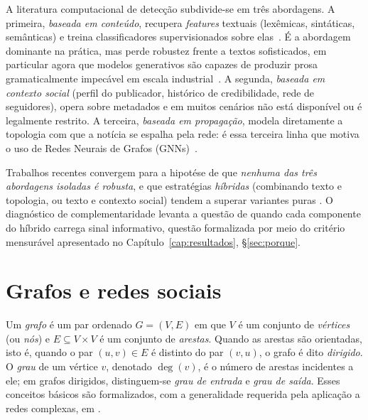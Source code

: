 A literatura computacional de detec\c{c}\~ao subdivide-se em tr\^es
abordagens. A primeira, \emph{baseada em conte\'udo}, recupera
\emph{features} textuais (lex\^emicas, sint\'aticas, sem\^anticas) e
treina classificadores supervisionados sobre elas~\cite{pmc_overviewfakenews,
mdpi_cnn_llm_nlp}. \'E a abordagem dominante na pr\'atica, mas perde
robustez frente a textos sofisticados, em particular agora que modelos
generativos s\~ao capazes de produzir prosa gramaticalmente
impec\'avel em escala industrial~\cite{arxiv_llmfakenews}. A segunda,
\emph{baseada em contexto social} (perfil do publicador, hist\'orico
de credibilidade, rede de seguidores), opera sobre metadados e em
muitos cen\'arios n\~ao est\'a dispon\'ivel ou \'e legalmente
restrito. A terceira, \emph{baseada em propaga\c{c}\~ao}, modela
diretamente a topologia com que a not\'icia se espalha pela rede:
\'e essa terceira linha que motiva o uso de Redes Neurais de Grafos
(GNNs)~\cite{monti2019fakenews, dou2021upfd, pmc_gnnsurveyfakenews}.

Trabalhos recentes convergem para a hipot\'ese de que \emph{nenhuma
das tr\^es abordagens isoladas \'e robusta}, e que estrat\'egias
\emph{h\'ibridas} (combinando texto e topologia, ou texto e contexto
social) tendem a superar variantes puras
\cite{mdpi_bidirectionalgcn, pmc_multimodalfakenews}. O diagn\'ostico
de complementaridade levanta a quest\~ao de quando
cada componente do h\'ibrido carrega sinal informativo, quest\~ao formalizada
por meio do crit\'erio mensur\'avel apresentado no
Cap\'itulo~\ref{cap:resultados}, \S\ref{sec:porque}.

\section{Grafos e redes sociais}
\label{sec:grafos}

Um \emph{grafo} \'e um par ordenado $G = (V, E)$ em que $V$ \'e um
conjunto de \emph{v\'ertices} (ou \emph{n\'os}) e $E \subseteq V \times
V$ \'e um conjunto de \emph{arestas}. Quando as arestas s\~ao
orientadas, isto \'e, quando o par $(u, v) \in E$ \'e distinto do par
$(v, u)$, o grafo \'e dito \emph{dirigido}. O \emph{grau} de um v\'ertice
$v$, denotado $\deg(v)$, \'e o n\'umero de arestas incidentes a ele; em
grafos dirigidos, distinguem-se \emph{grau de entrada} e \emph{grau de
sa\'ida}. Esses conceitos b\'asicos s\~ao formalizados, com a
generalidade requerida pela aplica\c{c}\~ao a redes complexas, em
\cite{newman2003structure}.

